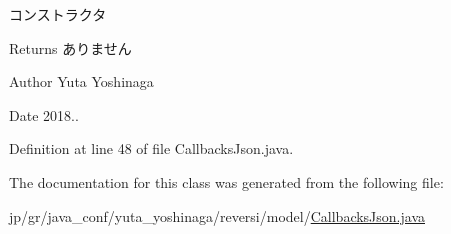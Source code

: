 コンストラクタ 

\begin{DoxyReturn}{Returns}
ありません 
\end{DoxyReturn}
\begin{DoxyAuthor}{Author}
Yuta Yoshinaga 
\end{DoxyAuthor}
\begin{DoxyDate}{Date}
2018.. 
\end{DoxyDate}


Definition at line 48 of file Callbacks\+Json.\+java.



The documentation for this class was generated from the following file\+:\begin{DoxyCompactItemize}
\item 
jp/gr/java\+\_\+conf/yuta\+\_\+yoshinaga/reversi/model/\mbox{\hyperlink{_callbacks_json_8java}{Callbacks\+Json.\+java}}\end{DoxyCompactItemize}
